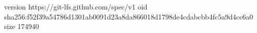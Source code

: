 version https://git-lfs.github.com/spec/v1
oid sha256:f52f39a54786d1301ab0091d23a8da866018d1798de4cdabcbb4fc5a9d4cc6a0
size 174940
